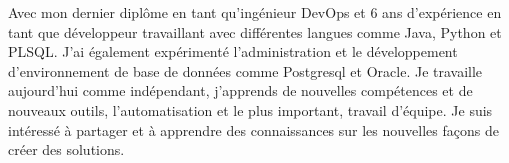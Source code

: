 %
%
%
\par{
Avec mon dernier diplôme en tant qu’ingénieur DevOps et 6 ans d’expérience en tant que développeur travaillant avec différentes langues comme Java, Python et PLSQL. J’ai également expérimenté l’administration et le développement d’environnement de base de données comme Postgresql et Oracle. 
Je travaille aujourd’hui comme indépendant, j’apprends de nouvelles compétences et de nouveaux outils, l’automatisation et le plus important, travail d’équipe. Je suis intéressé à partager et à apprendre des connaissances sur les nouvelles façons de créer des solutions.
}
